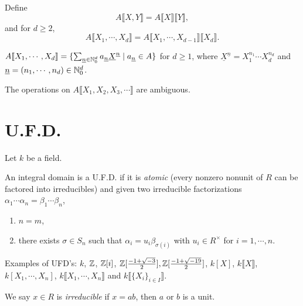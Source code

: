 \begin{definition}
    Define
    \[A\llbracket X,Y \rrbracket = A\llbracket X \rrbracket \llbracket Y \rrbracket,\]
    and for $d \geq 2$,
    \[A\llbracket X_1,\cdots,X_d \rrbracket = A \llbracket X_1,\cdots,X_{d-1} \rrbracket \llbracket X_d \rrbracket.\]
\end{definition}

\begin{fact}
    $A\llbracket X_1,\cdots,X_d \rrbracket = \{\sum_{\underline n \in \mathbb{N}_0^d} a_{\underline n} \underline X^{\underline n} \mid a_{\underline n} \in A\}$ for $d \geq 1$, where $\underline X^{\underline n} = X_1^{n_1} \cdots X_d^{n_d}$ and $\underline n = (n_1,\cdots,n_d) \in \mathbb{N}_0^d$.
\end{fact}

\begin{warning}
    The operations on $A\llbracket X_1,X_2,X_3,\cdots \rrbracket$ are ambiguous.
\end{warning}


\section*{U.F.D.}

Let $k$ be a field.

\begin{definition}
    An integral domain is a U.F.D. if it is \emph{atomic} (every nonzero nonunit of $R$ can be factored into irreducibles) and given two irreducible factorizations $\alpha_1 \cdots \alpha_n = \beta_1 \cdots \beta_n$,
    \begin{enumerate}
        \item $n = m$,
        \item there exists $\sigma \in S_n$ such that $\alpha_i = u_i \beta_{\sigma(i)}$ with $u_i \in R^{\times}$ for $i = 1,\cdots,n$.
    \end{enumerate}
\end{definition}

\begin{example}
    Examples of UFD's: $k$, $\mathbb{Z}$, $\mathbb{Z}[i]$, $\mathbb{Z}[\frac{-1+\sqrt {-3}}{2}],\mathbb{Z}[\frac{-1+\sqrt{-19}}{2}]$, $k[X]$, $k\llbracket X \rrbracket$, $k[X_1,\cdots,X_n]$, $k\llbracket X_1,\cdots,X_n \rrbracket $ and $k\llbracket \{X_i\}_{i \in I} \rrbracket$.
\end{example}

\begin{definition}
    We say $x \in R$ is \emph{irreducible} if $x = ab$, then $a$ or $b$ is a unit.
\end{definition}

